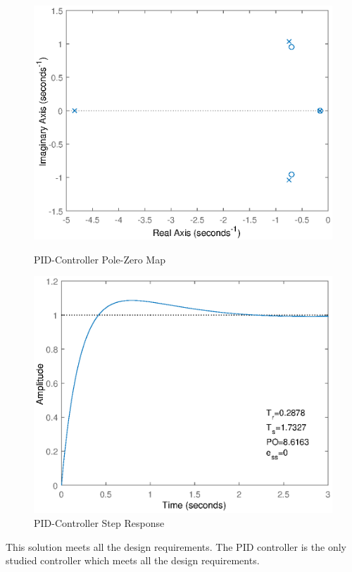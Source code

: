 \documentclass{article}
\begin{document}
    \begin{figure}[ht]
        \centering
        \begin{minipage}[t]{.5\textwidth}
            \includegraphics[scale=.5]{PIDPoles.eps}
            \caption{PID-Controller Pole-Zero Map}
            \label{fig:PIDPoles}
            \end{minipage}%
        \begin{minipage}[t]{.5\textwidth}
            \includegraphics[scale=.5]{PIDResponse.eps}
            \caption{PID-Controller Step Response}
            \label{fig:PIDResponse}
        \end{minipage}\hfill
    \end{figure}
    This solution meets all the design requirements.
    The PID controller is the only studied controller which meets all the design requirements.
\end{document}
